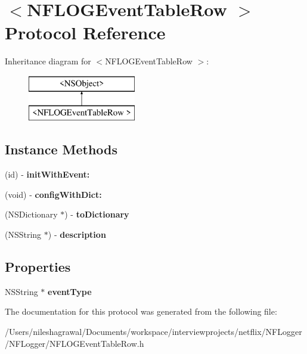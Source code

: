 \hypertarget{protocol_n_f_l_o_g_event_table_row_01-p}{}\section{$<$N\+F\+L\+O\+G\+Event\+Table\+Row $>$ Protocol Reference}
\label{protocol_n_f_l_o_g_event_table_row_01-p}
Inheritance diagram for $<$N\+F\+L\+O\+G\+Event\+Table\+Row $>$\+:\begin{figure}[H]
\begin{center}
\leavevmode
\includegraphics[height=2.000000cm]{protocol_n_f_l_o_g_event_table_row_01-p}
\end{center}
\end{figure}
\subsection*{Instance Methods}
\begin{DoxyCompactItemize}
\item 
\mbox{\label{protocol_n_f_l_o_g_event_table_row_01-p_a48e240b590aff9fe96325f3033a71b23}} 
(id) -\/ {\bfseries init\+With\+Event\+:}
\item 
\mbox{\label{protocol_n_f_l_o_g_event_table_row_01-p_ac2c53acad7e0a7cd1258e930edbc2fad}} 
(void) -\/ {\bfseries config\+With\+Dict\+:}
\item 
\mbox{\label{protocol_n_f_l_o_g_event_table_row_01-p_a208b99d2beddfdc5b0a4d92b96f1c228}} 
(N\+S\+Dictionary $\ast$) -\/ {\bfseries to\+Dictionary}
\item 
\mbox{\label{protocol_n_f_l_o_g_event_table_row_01-p_a0f1c0ba7d600455d053cc7f36a2e7c5c}} 
(N\+S\+String $\ast$) -\/ {\bfseries description}
\end{DoxyCompactItemize}
\subsection*{Properties}
\begin{DoxyCompactItemize}
\item 
\mbox{\label{protocol_n_f_l_o_g_event_table_row_01-p_a785ed107fddfda035682f36cb30061cd}} 
N\+S\+String $\ast$ {\bfseries event\+Type}
\end{DoxyCompactItemize}


The documentation for this protocol was generated from the following file\+:\begin{DoxyCompactItemize}
\item 
/\+Users/nileshagrawal/\+Documents/workspace/interviewprojects/netflix/\+N\+F\+Logger/\+N\+F\+Logger/N\+F\+L\+O\+G\+Event\+Table\+Row.\+h\end{DoxyCompactItemize}
